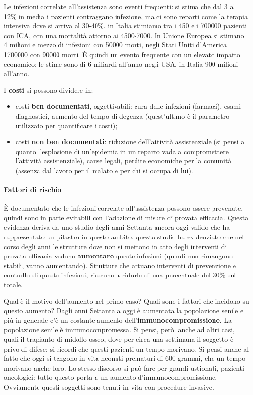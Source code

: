 Le infezioni correlate all'assistenza sono eventi frequenti: si stima
che dal 3 al 12\% in media i pazienti contraggano infezione, ma ci sono
reparti come la terapia intensiva dove si arriva al 30-40\%. in Italia
stimiamo tra i 450 e i 700000 pazienti con ICA, con una mortalità
attorno ai 4500-7000. In Unione Europea si stimano 4 milioni e mezzo di
infezioni con 50000 morti, negli Stati Uniti d'America 1700000 con 90000
morti. È quindi un evento frequente con un elevato impatto economico: le
stime sono di 6 miliardi all'anno negli USA, in Italia 900 milioni
all'anno.

I \textbf{costi} si possono dividere in:

\begin{itemize}
\item
  costi \textbf{ben documentati}, oggettivabili: cura delle infezioni
  (farmaci), esami diagnostici, aumento del tempo di degenza
  (quest'ultimo è il parametro utilizzato per quantificare i costi);
\item
  costi \textbf{non ben documentati}: riduzione dell'attività
  assistenziale (si pensi a quanto l'esplosione di un'epidemia in un
  reparto vada a compromettere l'attività assistenziale), cause legali,
  perdite economiche per la comunità (assenza dal lavoro per il malato e
  per chi si occupa di lui).
\end{itemize}

\paragraph{Fattori di rischio}

È documentato che le infezioni correlate all'assistenza possono essere
prevenute, quindi sono in parte evitabili con l'adozione di misure di
provata efficacia. Questa evidenza deriva da uno studio degli anni
Settanta ancora oggi valido che ha rappresentato un pilastro in questo
ambito: questo studio ha evidenziato che nel corso degli anni le
strutture dove non si mettono in atto degli interventi di provata
efficacia vedono \textbf{aumentare} queste infezioni (quindi non
rimangono stabili, vanno aumentando). Strutture che attuano interventi
di prevenzione e controllo di queste infezioni, riescono a ridurle di
una percentuale del 30\% sul totale.

Qual è il motivo dell'aumento nel primo caso? Quali sono i fattori che
incidono su questo aumento? Dagli anni Settanta a oggi è aumentata la
popolazione senile e più in generale c'è un costante aumento
dell'\textbf{immunocompromissione}. La popolazione senile è
immunocompromessa. Si pensi, però, anche ad altri casi, quali il
trapianto di midollo osseo, dove per circa una settimana il soggetto è
privo di difese: si ricordi che questi pazienti un tempo morivano. Si
pensi anche al fatto che oggi si tengono in vita neonati prematuri di
600 grammi, che un tempo morivano anche loro. Lo stesso discorso si può
fare per grandi ustionati, pazienti oncologici: tutto questo porta a un
aumento d'immunocompromissione. Ovviamente questi soggetti sono tenuti
in vita con procedure invasive.

